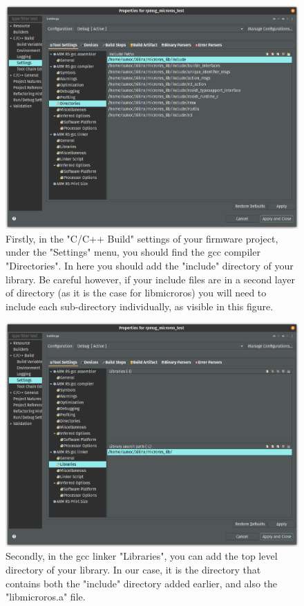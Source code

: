 \documentclass[10pt]{article}
\begin{document}
\begin{figure}[htbp]
\centering
\includegraphics[width=.8\textwidth]{./img/vitis_new/include.png}
\caption{\label{fig:orge7798b4}Firstly, in the "C/C++ Build" settings of your firmware project, under the "Settings" menu, you should find the gcc compiler "Directories". In here you should add the "include" directory of your library. Be careful however, if your include files are in a second layer of directory (as it is the case for libmicroros) you will need to include each sub-directory individually, as visible in this figure.}
\end{figure}

\begin{figure}[htbp]
\centering
\includegraphics[width=.8\textwidth]{./img/vitis_new/include2.png}
\caption{\label{fig:org843418f}Secondly, in the gcc linker "Libraries", you can add the top level directory of your library. In our case, it is the directory that contains both the "include" directory added earlier, and also the "libmicroros.a" file.}
\end{figure}
\end{document}
